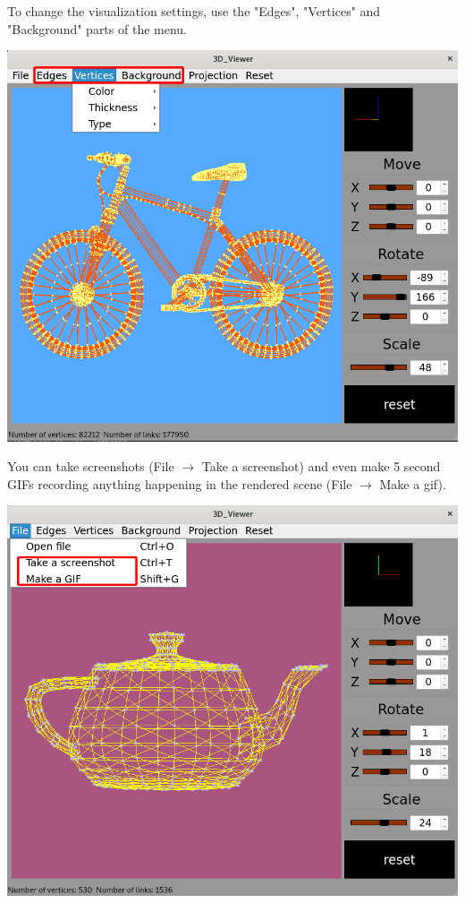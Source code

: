 \documentclass[a4paper, 12pt]{article}
\begin{document}
\newpage
To change the visualization settings, use the "Edges", "Vertices" and "Background" parts of the menu.
\begin{center}
  \includegraphics[width=1\textwidth]{images/color_settings.png}
\end{center}

\newpage
You can take screenshots (File $\rightarrow$ Take a screenshot) and even make 5 second GIFs recording anything happening in the rendered scene (File $\rightarrow$ Make a gif).
\begin{center}
  \includegraphics[width=1\textwidth]{images/screenshots_and_gifs.png}
  
\end{center}
\end{document}
